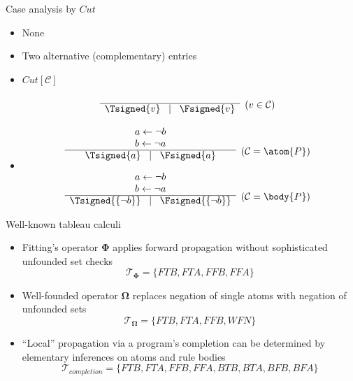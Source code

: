 \begin{frame}{Case analysis by $\textit{Cut}$}
\begin{itemize}
\item {} None
\item {} Two alternative (complementary) entries
\item {} \textnormal{$\textit{Cut}[\mathcal{C}]$}~\\[-5mm]
\[
\begin{array}{cl}
&
\raisebox{-8pt}[0pt][0pt]{($v \in {\mathcal{C}}$)}
\\\cline{1-1}
\Tsigned{v} \;\; \mid \;\; \Fsigned{v}
\end{array}
\]
\item<2-> 
\[
\begin{array}{cl}
a \leftarrow \neg b \\
b \leftarrow \neg a &
\raisebox{-8pt}[0pt][0pt]{(${\mathcal{C}} = \atom{P}$)}
\\\cline{1-1}
\Tsigned{a} \;\; \mid \;\; \Fsigned{a}
\\[10pt]
a \leftarrow \neg b \\
b \leftarrow \neg a &
\raisebox{-8pt}[0pt][0pt]{(${\mathcal{C}} = \body{P}$)}
\\\cline{1-1}
\Tsigned{\{\neg b\}} \;\; \mid \;\; \Fsigned{\{\neg b\}}
\end{array}
\]
\end{itemize}
\end{frame}
\begin{frame}{Well-known tableau calculi}
  \begin{itemize}
  \item <1-> Fitting's operator $\mathbf{\Phi}$ applies forward propagation without sophisticated
    unfounded set checks
    \[
    {\mathcal{T}}_{\mathbf{\Phi}} = \{\textit{FTB},\textit{FTA},\textit{FFB},\textit{FFA}\}
    \]
  \item <2-> Well-founded operator $\mathbf{\Omega}$ replaces negation of single atoms with negation
    of unfounded sets
    \[
    {\mathcal{T}}_{\mathbf{\Omega}} = \{\textit{FTB},\textit{FTA},\textit{FFB},\textit{WFN}\}
    \]
  \item <3-> ``Local'' propagation via a program's completion can be determined by elementary
    inferences on atoms and rule bodies
    \[
    {\mathcal{T}}_{\textit{completion}} =
    \{\textit{FTB},\textit{FTA},\textit{FFB},\textit{FFA},\textit{BTB},\textit{BTA},\textit{BFB},\textit{BFA}\}
    \]
  \end{itemize}
\end{frame}
